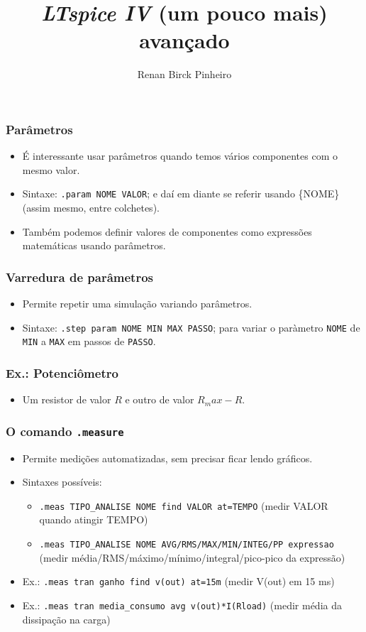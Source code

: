 \documentclass{beamer}
\title{\textit{LTspice IV} (um pouco mais) avançado}
\author{Renan Birck Pinheiro}
\institute{Universidade Federal de Santa Maria}
\begin{document}
\begin{frame}
\titlepage
\end{frame}

\begin{frame} %
\frametitle{Parâmetros}
\begin{itemize}
\item É interessante usar parâmetros quando temos vários componentes com o mesmo valor.
\item Sintaxe: \texttt{.param NOME VALOR}; e daí em diante se referir usando \{NOME\} (assim mesmo, entre colchetes).
\item Também podemos definir valores de componentes como expressões matemáticas usando parâmetros.
\end{itemize}
\end{frame} %

\begin{frame} %
\frametitle{Varredura de parâmetros}
\begin{itemize}
\item Permite repetir uma simulação variando parâmetros.
\item Sintaxe: \texttt{.step param NOME MIN MAX PASSO}; para variar o paràmetro \texttt{NOME} de \texttt{MIN} a \texttt{MAX} em passos de \texttt{PASSO}.
\end{itemize}
\end{frame} %

\begin{frame}
\frametitle{Ex.: Potenciômetro}
\begin{itemize}
\item Um resistor de valor $R$ e outro de valor $R_max - R$.

\end{itemize}
\end{frame}

\begin{frame}
\frametitle{O comando \texttt{.measure}}
\begin{itemize}
\item Permite medições automatizadas, sem precisar ficar lendo gráficos.
\item Sintaxes possíveis:
\begin{itemize}
\item \texttt{.meas TIPO\_ANALISE NOME find VALOR at=TEMPO} (medir VALOR quando atingir TEMPO)
\item \texttt{.meas TIPO\_ANALISE NOME AVG/RMS/MAX/MIN/INTEG/PP expressao} (medir média/RMS/máximo/mínimo/integral/pico-pico da expressão)
\end{itemize}
\item Ex.: \texttt{.meas tran ganho find v(out) at=15m} (medir V(out) em 15 ms)
\item Ex.: \texttt{.meas tran media\_consumo avg v(out)*I(Rload)} (medir média da dissipação na carga)

\end{itemize}
\end{frame}
\end{document}
